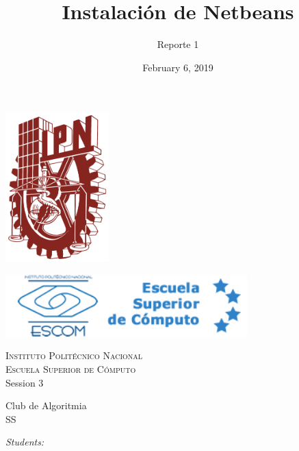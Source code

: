 \documentclass[12pt]{article}
\date{February 6, 2019}
\title{Instalación de Netbeans}
\author{Reporte 1}
\begin{document}
    \begin{titlepage}
		\begin{center}
			
			\noindent
			\begin{minipage}{0.5\textwidth}
				\begin{flushleft} \large
					\includegraphics[width=0.3\textwidth]{../ipn.png}
				\end{flushleft}
			\end{minipage}%
			\begin{minipage}{0.55\textwidth}
				\begin{flushright} \large
					\includegraphics[width=0.7\textwidth]{../escom.png}
				\end{flushright}
			\end{minipage}
			
			\textsc{\LARGE Instituto Politécnico Nacional}\\[0.5cm]
			
			\textsc{\Large Escuela Superior de Cómputo}\\[1cm]
			
			
			{ \huge Session 3 \\[1cm] }
			
			{ \Large Club de Algoritmia} \\[1cm]
			
			{ \Large SS  } \\[1cm]
			
			\noindent
			\begin{minipage}{0.5\textwidth}
				\begin{flushleft} \large
					\emph{Students:}\\
					

\end{flushleft}
\end{minipage}
\end{center}
\end{titlepage}
\end{document}
